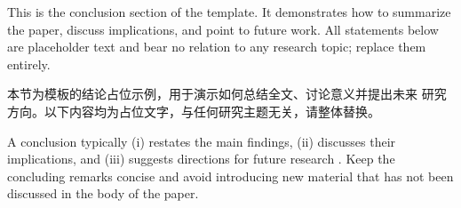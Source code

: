 
This is the conclusion section of the template. It demonstrates how to
summarize the paper, discuss implications, and point to future work. All
statements below are placeholder text and bear no relation to any research
topic; replace them entirely.

本节为模板的结论占位示例，用于演示如何总结全文、讨论意义并提出未来
研究方向。以下内容均为占位文字，与任何研究主题无关，请整体替换。

A conclusion typically (i) restates the main findings, (ii) discusses their
implications, and (iii) suggests directions for future research
\citep{author2024working}. Keep the concluding remarks concise and avoid
introducing new material that has not been discussed in the body of the
paper.
